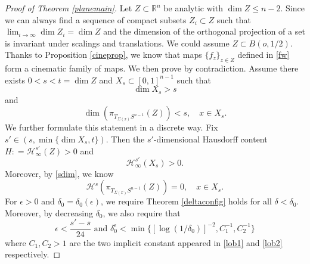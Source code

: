 \documentclass[11pt,a4paper,reqno]{amsart}
\newcommand{\R}{\mathbb{R}}
\newcommand{\1}{\mathbf{1}}
\numberwithin{equation}{section}
\theoremstyle{plain}
\theoremstyle{definition}
\theoremstyle{remark}
\begin{document}
\begin{proof}[Proof of Theorem \ref{planemain}]
    Let $Z \subset \R^n$ be analytic with $\dim Z \le n-2$. Since we can always find a sequence of compact subsets $Z_i \subset Z$ such that $\lim_{i \to \infty}\dim Z_i=\dim Z$ and the dimension of the orthogonal projection of a set is invariant under scalings and translations. We could assume $Z \subset B(o,1/2)$.
    Thanks to Proposition \ref{cineprop}, we know that maps $\{f_z\}_{z \in Z}$ defined in \eqref{fw} form a cinematic family of maps.
     We then prove by contradiction. Assume there exists $0<s< t=\dim Z$ and $X_s \subset [0,1]^{n-1}$ such that
  $$ \dim X_s > s $$
  and
  \begin{equation}\label{sdim}
    \dim(\pi_{T_{\Sigma(x)}S^{n-1}}(Z) ) < s, \quad x \in X_s.
  \end{equation}
   We further formulate this statement in a discrete way.
  Fix $s'\in (s, \min\{\dim X_s, t\})$.
  Then the $s'$-dimensional Hausdorff content $H: = \mathcal{H}^{s'}_\infty(Z) >0$
  and
  $$\mathcal{H}^{s'}_\infty( X_s ) >0. $$
  Moreover, by \eqref{sdim}, we know
  $$ \mathcal{H}^{s}(\pi_{T_{\Sigma(x)}S^{n-1}}(Z)) =0, \quad x \in X_s.   $$
  For $\epsilon>0$ and $\delta_0=\delta_0(\epsilon)$, we require Theorem \ref{deltaconfig} holds for all $\delta< \delta_0$. Moreover, by decreasing $\delta_0$, we also require that
  \begin{equation}\label{choiceez}
   \epsilon < \frac{s'-s}{24} \mbox{ and } \delta_0^\epsilon < \min\{ [\log(1/\delta_0)]^{-2}, C_1^{-1}, C_2^{-1}\}
  \end{equation}
  where $C_1,C_2>1$ are the two implicit constant appeared in \eqref{lob1} and \eqref{lob2} respectively.



\end{proof}
\end{document}

